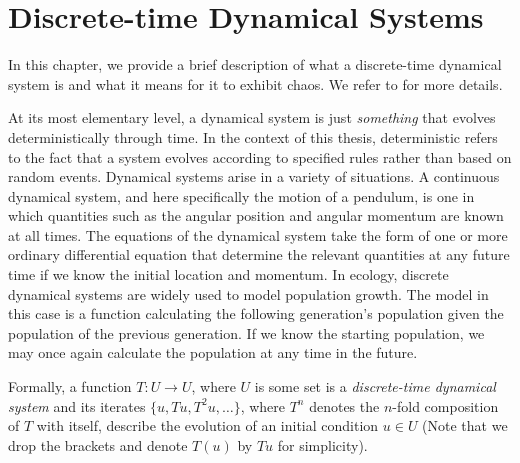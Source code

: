\documentclass[12 pt]{article}
\begin{document}
\section{Discrete-time Dynamical Systems}

In this chapter, we provide a brief description of what a discrete-time dynamical system is and what it means for it to exhibit chaos. We refer to \cite{devaney2018introduction, de2013elements} for more details. 

At its most elementary level, a dynamical system is just \emph{something} that evolves deterministically through time. In the context of this thesis, deterministic refers to the fact that a system evolves according to specified rules rather than based on random events. 
Dynamical systems arise in a variety of situations. A continuous dynamical system, and here specifically the motion of a pendulum, is one in which quantities such as the angular position and angular momentum are known at all times. 
The equations of the dynamical system take the form of one or more ordinary differential equation that determine the relevant quantities at any future time if we know the initial location and momentum. 
In ecology, discrete dynamical systems are widely used to model population growth. The model in this case is a function calculating the following generation's population given the population of the previous generation. If we know the starting population, we may once again calculate the population at any time in the future. 

Formally, a function $T: U \to U$, where $U$ is some set is  a \emph{discrete-time dynamical system} and its iterates $\{u,Tu,T^2u,\ldots\}$, where $T^n$ denotes the $n$-fold composition of $T$ with itself, describe the evolution of an initial condition $u\in U$ (Note that we drop the brackets and denote $T(u)$ by $Tu$ for simplicity).  
\end{document}
